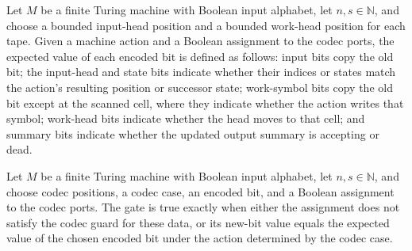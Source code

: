 \begin{definition}
\label{Complexity.codecExpected}
\leanok
{}
Let $M$ be a finite Turing machine with Boolean input alphabet, let $n,s\in\mathbb{N}$,
and choose a bounded input-head position and a bounded work-head position for each tape.
Given a machine action and a Boolean assignment to the codec ports, the expected value
of each encoded bit is defined as follows: input bits copy the old bit; the input-head
and state bits indicate whether their indices or states match the action's resulting
position or successor state; work-symbol bits copy the old bit except at the scanned
cell, where they indicate whether the action writes that symbol; work-head bits indicate
whether the head moves to that cell; and summary bits indicate whether the updated
output summary is accepting or dead.
\end{definition}

\begin{definition}
\label{Complexity.codecGate}
\leanok
{}
Let $M$ be a finite Turing machine with Boolean input alphabet, let $n,s\in\mathbb{N}$,
and choose codec positions, a codec case, an encoded bit, and a Boolean assignment to
the codec ports. The gate is true exactly when either the assignment does not satisfy
the codec guard for these data, or its new-bit value equals the expected value of the
chosen encoded bit under the action determined by the codec case.
\end{definition}

